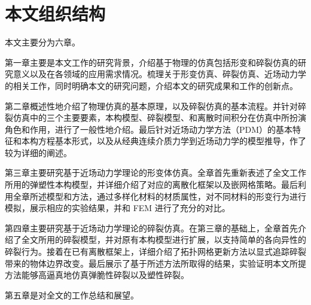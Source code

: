\section{本文组织结构}
本文主要分为六章。

第一章主要是本文工作的研究背景，介绍基于物理的仿真包括形变和碎裂仿真的研究意义以及在各领域的应用需求情况。梳理关于形变仿真、碎裂仿真、近场动力学的相关工作，同时明确本文的研究问题，介绍本文的研究成果和工作的创新点。

第二章概述性地介绍了物理仿真的基本原理，以及碎裂仿真的基本流程。并针对碎裂仿真中的三个主要要素，本构模型、碎裂模型、和离散时间积分在仿真中所扮演角色和作用，进行了一般性地介绍。最后针对近场动力学方法（PDM）的基本特征和本构方程基本形式，以及从经典连续介质力学到近场动力学的模型推导，作了较为详细的阐述。

第三章主要研究基于近场动力学理论的形变体仿真。全章首先重新表述了全文工作所用的弹塑性本构模型，并详细介绍了对应的离散化框架以及嵌网格策略。最后利用全章所述模型和方法，通过多样化材料的材质属性，对不同材料的形变行为进行模拟，展示相应的实验结果，并和 FEM 进行了充分的对比。

第四章主要研究基于近场动力学理论的碎裂仿真。在第三章的基础上，全章首先介绍了全文所用的碎裂模型，并对原有本构模型进行扩展，以支持简单的各向异性的碎裂行为。接着在已有离散框架上，详细介绍了拓扑网格更新方法以显式追踪碎裂带来的物体边界改变。最后展示了基于所述方法所取得的结果，实验证明本文所提方法能够高逼真地仿真弹脆性碎裂以及塑性碎裂。

第五章是对全文的工作总结和展望。


